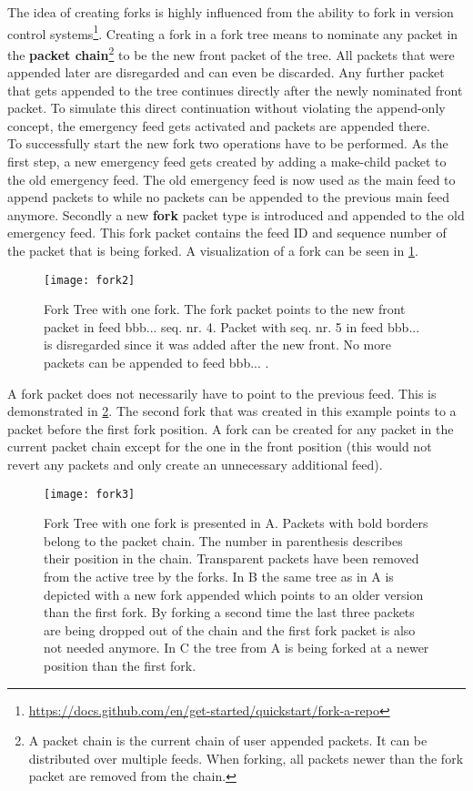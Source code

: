 The idea of creating forks is highly influenced from the ability to fork in version control systems\footnote{\url{https://docs.github.com/en/get-started/quickstart/fork-a-repo}}. Creating a fork in a fork tree means to nominate any packet in the \textbf{packet chain}\footnote{A packet chain is the current chain of user appended packets. It can be distributed over multiple feeds. When forking, all packets newer than the fork packet are removed from the chain.} to be the new front packet of the tree. All packets that were appended later are disregarded and can even be discarded. Any further packet that gets appended to the tree continues directly after the newly nominated front packet. To simulate this direct continuation without violating the append-only concept, the emergency feed gets activated and packets are appended there. \\
To successfully start the new fork two operations have to be performed. As the first step, a new emergency feed gets created by adding a make-child packet to the old emergency feed. The old emergency feed is now used as the main feed to append packets to while no packets can be appended to the previous main feed anymore. Secondly a new \textbf{fork} packet type is introduced and appended to the old emergency feed. This fork packet contains the feed ID and sequence number of the packet that is being forked. A visualization of a fork can be seen in \cref{fig:fork2}.

\begin{figure}
\centering
\texttt{[image: fork2]}
\caption{Fork Tree with one fork. The fork packet points to the new front packet in feed bbb... seq. nr. 4. Packet with seq. nr. 5 in feed bbb... is disregarded since it was added after the new front. No more packets can be appended to feed bbb... .}
\label{fig:fork2}
\end{figure}

A fork packet does not necessarily have to point to the previous feed. This is demonstrated in \cref{fig:fork3}. The second fork that was created in this example points to a packet before the first fork position. A fork can be created for any packet in the current packet chain except for the one in the front position (this would not revert any packets and only create an unnecessary additional feed).

\begin{figure}
\centering
\texttt{[image: fork3]}
\caption{Fork Tree with one fork is presented in A. Packets with bold borders belong to the packet chain. The number in parenthesis describes their position in the chain. Transparent packets have been removed from the active tree by the forks. In B the same tree as in A is depicted with a new fork appended which points to an older version than the first fork. By forking a second time the last three packets are being dropped out of the chain and the first fork packet is also not needed anymore. In C the tree from A is being forked at a newer position than the first fork.}
\label{fig:fork3}
\end{figure}


